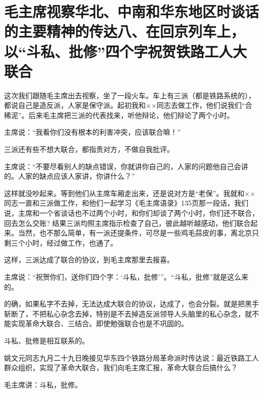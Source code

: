 \section[毛主席视察华北、中南和华东地区时谈话的主要精神的传达八、在回京列车上，以“斗私、批修”四个字祝贺铁路工人大联合]{毛主席视察华北、中南和华东地区时谈话的主要精神的传达八、在回京列车上，以“斗私、批修”四个字祝贺铁路工人大联合}


这次我们跟随毛主席出去视察，坐了一段火车。车上有三派（都是铁路系统的），都说自己是造反派，人家是保守派。起初我和××同志去做工作，他们说我们“合稀泥”。后来毛主席把三派的代表找来，听他辩论，他们辩论了两个小时。

主席说：“我看你们没有根本的利害冲突，应该联合嘛！”

三派还有些不想大联合，都指责对方，不做自我批评。

主席说：“不要尽看别人的缺点错误，你就讲你自己的，人家的问题他自己会讲的。人家的缺点应该人家讲，你讲什么？”

这样就没吵起来。等到他们从主席车厢走出来，还是说对方是“老保”。我就和××同志一直和三派做工作，和他们一起学习《毛主席语录》135页那一段话，我们说，主席和一个省谈话也不过两个小时，和你们却谈了两个小时，你们还不联合，回去怎么交账? 结果三派均照主席指示检查了自己，彼此越听越感动，他们联合起来。当然，也不那么简单，有一派还提条件，可尽是一些鸡毛蒜皮的事，离北京只剩三个小时，经过做工作，也通了。

这样，三派达成了联合的协议，到毛主席那里去报喜。

主席说：“祝贺你们，送你们四个字：‘斗私，批修'”。“斗私，批修”就是这么来的。

的确，如果私字不去掉，无法达成大联合的协议，达成了，也会分裂。就是把黑手斩断了，不把私心杂念去掉，特别是不去掉造反派领导人头脑里的私心杂念，就不能实现革命大联合、三结合。即使勉强联合也是不巩固的。

斗私、批修是相互联系的。

姚文元同志九月二十九日晚接见华东四个铁路分局革命派时传达说：最近铁路工人群众组织，实现了革命大联合，我们向毛主席汇报，革命大联合后搞什么？

毛主席讲：斗私，批修。


